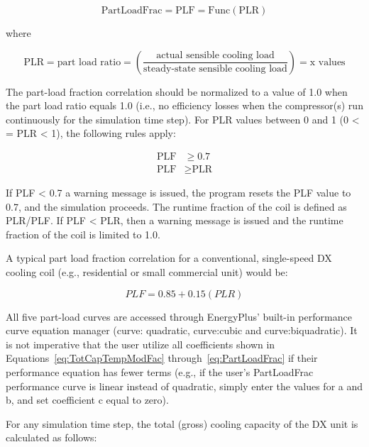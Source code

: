 \begin{equation}
\text{PartLoadFrac} = \text{PLF} = \text{Func}\left(\text{PLR}\right)
\label{eq:PartLoadFrac}
\end{equation}

where

\begin{equation}
\text{PLR} = \text{part load ratio} = \left(\frac{\text{actual sensible cooling load}}{\text{steady-state sensible cooling load}}\right) = \text{x values}
\end{equation}

The part-load fraction correlation should be normalized to a value of 1.0 when the part load ratio equals 1.0 (i.e., no efficiency losses when the compressor(s) run continuously for the simulation time step). For PLR values between 0 and 1 (0 \textless{} = PLR \textless{} 1), the following rules apply:

\begin{equation}
  \begin{array}{rl}
    \text{PLF} &\geq 0.7 \\
    \text{PLF} &\geq \text{PLR}
  \end{array}
\end{equation}

If PLF \textless{} 0.7 a warning message is issued, the program resets the PLF value to 0.7, and the simulation proceeds. The runtime fraction of the coil is defined as PLR/PLF. If PLF \textless{} PLR, then a warning message is issued and the runtime fraction of the coil is limited to 1.0.

A typical part load fraction correlation for a conventional, single-speed DX cooling coil (e.g., residential or small commercial unit) would be:

\begin{equation}
PLF = 0.85 + 0.15(PLR)
\end{equation}

All five part-load curves are accessed through EnergyPlus' built-in performance curve equation manager (curve: quadratic, curve:cubic and curve:biquadratic). It is not imperative that the user utilize all coefficients shown in Equations~\ref{eq:TotCapTempModFac} through~\ref{eq:PartLoadFrac} if their performance equation has fewer terms (e.g., if the user's PartLoadFrac performance curve is linear instead of quadratic, simply enter the values for a and b, and set coefficient c equal to zero).

For any simulation time step, the total (gross) cooling capacity of the DX unit is calculated as follows:

